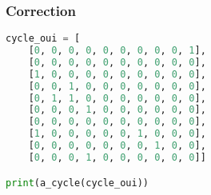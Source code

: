 \documentclass[svgnames,11pt]{beamer}
\begin{document}
\begin{frame}[fragile]
    \frametitle{Correction}

\begin{center}
\begin{lstlisting}[language=Python , basicstyle=\ttfamily\small, xleftmargin=2em, xrightmargin=2em]
cycle_oui = [
    [0, 0, 0, 0, 0, 0, 0, 0, 0, 1],
    [0, 0, 0, 0, 0, 0, 0, 0, 0, 0],
    [1, 0, 0, 0, 0, 0, 0, 0, 0, 0],
    [0, 0, 1, 0, 0, 0, 0, 0, 0, 0],
    [0, 1, 1, 0, 0, 0, 0, 0, 0, 0],
    [0, 0, 0, 1, 0, 0, 0, 0, 0, 0],
    [0, 0, 0, 0, 0, 0, 0, 0, 0, 0],
    [1, 0, 0, 0, 0, 0, 1, 0, 0, 0],
    [0, 0, 0, 0, 0, 0, 0, 1, 0, 0],
    [0, 0, 0, 1, 0, 0, 0, 0, 0, 0]]

print(a_cycle(cycle_oui))
\end{lstlisting}
\end{center}

\end{frame}
\end{document}
